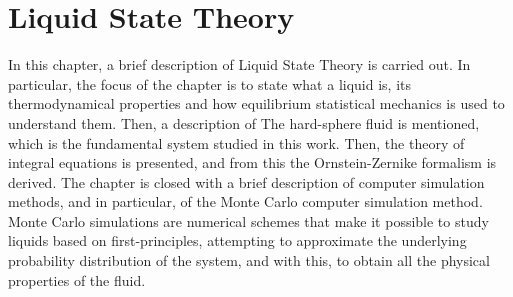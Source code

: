 \chapter{Liquid State Theory}
\label{Cap2}

In this chapter, a brief description of Liquid State Theory is carried out. In particular, 
the focus of the chapter is to state what a liquid is, its thermodynamical properties and
how equilibrium statistical mechanics is used to understand them. Then, a description of 
The hard-sphere fluid is mentioned, which is the fundamental system studied in this work.
Then, the theory of integral equations is presented, and from this the Ornstein-Zernike 
formalism is derived. The chapter is closed with a brief description of computer simulation
methods, and in particular, of the Monte Carlo computer simulation method. Monte Carlo 
simulations are numerical schemes that make it possible to study liquids based on 
first-principles, attempting to approximate the underlying probability distribution of
the system, and with this, to obtain all the physical properties of the fluid.